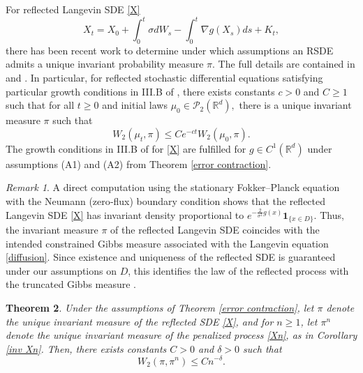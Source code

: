 \documentclass[amsfonts, reqno]{amsart}
\newtheorem{thm}{Theorem}[section]
\theoremstyle{definition}
\theoremstyle{remark}
\newtheorem{rem}[thm]{Remark}
\newcommand{\bbR}{\mathbb{R}}
\numberwithin{equation}{section}
\begin{document}
For reflected Langevin SDE \eqref{X} \begin{equation*}
    X_t =X_0 + \int_{0}^{t} \sigma dW_s -\int_{0}^{t}\nabla g(X_s) ds +K_t,
\end{equation*}
there has been recent work to determine under which assumptions an RSDE admits a unique invariant probability measure $\pi$. The full details are contained in \cite{Eberle2019} and \cite{Lamperski2021}. In particular, for reflected stochastic differential equations satisfying particular growth conditions in III.B of \cite{Lamperski2021}, there exists constants $c > 0$ and $C \geq 1$ such that for all $t \geq 0$ and initial laws $\mu_0 \in \mathcal{P}_2(\bbR^d),$ there is a unique invariant measure $\pi$ such that \begin{equation}\label{inv Xt}
    W_2(\mu_t, \pi) \leq Ce^{-ct}W_2(\mu_0, \pi).
\end{equation}
The growth conditions in III.B of \cite{Lamperski2021} for \eqref{X} are fulfilled for $g \in C^1(\bbR^d)$ under assumptions (A1) and (A2) from Theorem \ref{error contraction}. 

\begin{rem}
A direct computation using the stationary Fokker--Planck equation with
the Neumann (zero‐flux) boundary condition shows that the reflected Langevin SDE \eqref{X} has invariant density proportional to $e^{-\frac{2}{\sigma^2}g(x)}\mathbf{1}_{\{x\in D\}}$. Thus, the invariant measure $\pi$ of the reflected Langevin SDE coincides with the intended constrained Gibbs
measure associated with the Langevin equation \eqref{diffusion}. Since existence and uniqueness of the reflected SDE is guaranteed under our assumptions on $D$, this identifies the law of the reflected process with the truncated Gibbs measure \cites{Tanaka1979, Lions1984}.
\end{rem}


\begin{thm}\label{final bound}
Under the assumptions of Theorem \ref{error contraction}, let $\pi$ denote the unique invariant measure of the reflected SDE \eqref{X}, and for $n \geq 1$, let $\pi^n$ denote the unique invariant measure of the penalized process \eqref{Xn}, as in Corollary \ref{inv Xn}. Then, there exists constants $C > 0$ and $\delta > 0$ such that
\[
W_2(\pi, \pi^n) \leq C n^{-\delta}.
\]
\end{thm}
\end{document}
